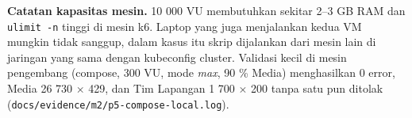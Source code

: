 \textbf{Catatan kapasitas mesin.} 10 000 VU membutuhkan sekitar 2--3 GB RAM dan \texttt{ulimit -\allowbreak{}n} tinggi di mesin k6. Laptop yang juga menjalankan kedua VM mungkin tidak sanggup, dalam kasus itu skrip dijalankan dari mesin lain di jaringan yang sama dengan kubeconfig cluster. Validasi kecil di mesin pengembang (compose, 300 VU, mode \emph{max}, 90 \% Media) menghasilkan 0 error, Media 26 730 $\times$ 429, dan Tim Lapangan 1 700 $\times$ 200 tanpa satu pun ditolak (\texttt{docs/\allowbreak{}evidence/\allowbreak{}m2/\allowbreak{}p5-\allowbreak{}compose-\allowbreak{}local.\allowbreak{}log}).

